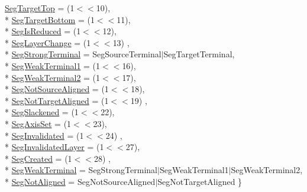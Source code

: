 \begin{DoxyCompactItemize}
\hyperlink{namespaceKatabatic_a94585537ee1724ea9315578ec54380f4a100b7ff78619133970733fedbb34ffa8}{Seg\-Target\-Top} = (1$<$$<$10), 
\\*
\hyperlink{namespaceKatabatic_a94585537ee1724ea9315578ec54380f4ae600c6015187dddac3860fcc008a2213}{Seg\-Target\-Bottom} = (1$<$$<$11), 
\\*
\hyperlink{namespaceKatabatic_a94585537ee1724ea9315578ec54380f4af4dd1db46475e4a16555fb6978a85580}{Seg\-Is\-Reduced} = (1$<$$<$12), 
\\*
\hyperlink{namespaceKatabatic_a94585537ee1724ea9315578ec54380f4afc9fc027fe8f457520c3fe6fb1144b2b}{Seg\-Layer\-Change} = (1$<$$<$13)
, \\*
\hyperlink{namespaceKatabatic_a94585537ee1724ea9315578ec54380f4a93251a6b8197685e2aaf77a760851557}{Seg\-Strong\-Terminal} = Seg\-Source\-Terminal$|$\-Seg\-Target\-Terminal, 
\\*
\hyperlink{namespaceKatabatic_a94585537ee1724ea9315578ec54380f4a7b3e09b8ab4cf676fd308535d7fba892}{Seg\-Weak\-Terminal1} = (1$<$$<$16), 
\\*
\hyperlink{namespaceKatabatic_a94585537ee1724ea9315578ec54380f4a32f77fa2da27348bcfc294a039efd766}{Seg\-Weak\-Terminal2} = (1$<$$<$17), 
\\*
\hyperlink{namespaceKatabatic_a94585537ee1724ea9315578ec54380f4a286b96fc8ab2377a2caf92c82352b0c8}{Seg\-Not\-Source\-Aligned} = (1$<$$<$18), 
\\*
\hyperlink{namespaceKatabatic_a94585537ee1724ea9315578ec54380f4ac5042810c9268798def84444d31968ea}{Seg\-Not\-Target\-Aligned} = (1$<$$<$19)
, \\*
\hyperlink{namespaceKatabatic_a94585537ee1724ea9315578ec54380f4ac47f838c52b3b33b1150eb53133c2383}{Seg\-Slackened} = (1$<$$<$22), 
\\*
\hyperlink{namespaceKatabatic_a94585537ee1724ea9315578ec54380f4a86d22dbc8fbc045a1e12e25ba357e1d1}{Seg\-Axis\-Set} = (1$<$$<$23), 
\\*
\hyperlink{namespaceKatabatic_a94585537ee1724ea9315578ec54380f4a3c1d76fecee6a8bd5e12ce3fec013827}{Seg\-Invalidated} = (1$<$$<$24)
, \\*
\hyperlink{namespaceKatabatic_a94585537ee1724ea9315578ec54380f4a11c86dd3185eb251b2f3ce536cc2ab34}{Seg\-Invalidated\-Layer} = (1$<$$<$27), 
\\*
\hyperlink{namespaceKatabatic_a94585537ee1724ea9315578ec54380f4a01513b74d37a8721370cf7b91fb419ad}{Seg\-Created} = (1$<$$<$28)
, \\*
\hyperlink{namespaceKatabatic_a94585537ee1724ea9315578ec54380f4a419e7722198b077c1f71d6c47e2fc2ab}{Seg\-Weak\-Terminal} = Seg\-Strong\-Terminal$|$\-Seg\-Weak\-Terminal1$|$\-Seg\-Weak\-Terminal2, 
\\*
\hyperlink{namespaceKatabatic_a94585537ee1724ea9315578ec54380f4a637e0426170a532feac45548e009325d}{Seg\-Not\-Aligned} = Seg\-Not\-Source\-Aligned$|$\-Seg\-Not\-Target\-Aligned
 \}
\end{DoxyCompactItemize}


